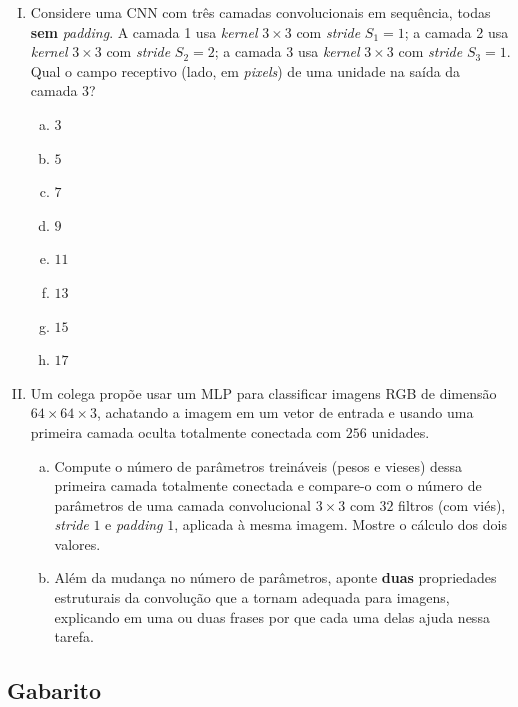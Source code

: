 \documentclass{dlproblemset}
\begin{document}
\begin{enumerate}[I)]
    \item Considere uma CNN com três camadas convolucionais em sequência, todas \textbf{sem} \textit{padding}. A camada 1 usa \textit{kernel} $3\times 3$ com \textit{stride} $S_1 = 1$; a camada 2 usa \textit{kernel} $3\times 3$ com \textit{stride} $S_2 = 2$; a camada 3 usa \textit{kernel} $3\times 3$ com \textit{stride} $S_3 = 1$. Qual o campo receptivo (lado, em \textit{pixels}) de uma unidade na saída da camada 3?
    \begin{enumerate}[a)]
        \item $3$
        \item $5$
        \item $7$
        \item $9$
        \item $11$
        \item $13$
        \item $15$
        \item $17$
    \end{enumerate}

    \item Um colega propõe usar um MLP para classificar imagens RGB de dimensão $64 \times 64 \times 3$, achatando a imagem em um vetor de entrada e usando uma primeira camada oculta totalmente conectada com $256$ unidades.

    \begin{enumerate}[a)]
        \item Compute o número de parâmetros treináveis (pesos e vieses) dessa primeira camada totalmente conectada e compare-o com o número de parâmetros de uma camada convolucional $3 \times 3$ com $32$ filtros (com viés), \textit{stride} $1$ e \textit{padding} $1$, aplicada à mesma imagem. Mostre o cálculo dos dois valores.
        \item Além da mudança no número de parâmetros, aponte \textbf{duas} propriedades estruturais da convolução que a tornam adequada para imagens, explicando em uma ou duas frases por que cada uma delas ajuda nessa tarefa.
    \end{enumerate}

\end{enumerate}

\newpage
\subsection*{Gabarito}
\color{blue}
\end{document}
